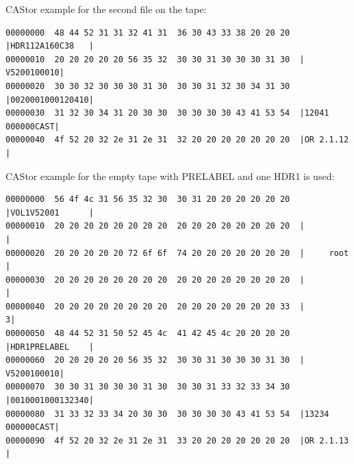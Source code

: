 \begin{table}[H]
\begin{center}
\begin{tabularx}{\textwidth}{ |c|c|c|X| }
\end{tabularx}
\end{center}
CAStor example for the second file on the tape:
\begin{small}
\begin{verbatim}
00000000  48 44 52 31 31 32 41 31  36 30 43 33 38 20 20 20  |HDR112A160C38   |
00000010  20 20 20 20 20 56 35 32  30 30 31 30 30 30 31 30  |     V5200100010|
00000020  30 30 32 30 30 30 31 30  30 30 31 32 30 34 31 30  |0020001000120410|
00000030  31 32 30 34 31 20 30 30  30 30 30 30 43 41 53 54  |12041 000000CAST|
00000040  4f 52 20 32 2e 31 2e 31  32 20 20 20 20 20 20 20  |OR 2.1.12       |
\end{verbatim}
\end{small}
\end{table}

\begin{minipage}{\linewidth}
CAStor example for the empty tape with PRELABEL and one HDR1 is used:
\begin{small}
\begin{verbatim}
00000000  56 4f 4c 31 56 35 32 30  30 31 20 20 20 20 20 20  |VOL1V52001      |
00000010  20 20 20 20 20 20 20 20  20 20 20 20 20 20 20 20  |                |
00000020  20 20 20 20 20 72 6f 6f  74 20 20 20 20 20 20 20  |     root       |
00000030  20 20 20 20 20 20 20 20  20 20 20 20 20 20 20 20  |                |
00000040  20 20 20 20 20 20 20 20  20 20 20 20 20 20 20 33  |               3|
00000050  48 44 52 31 50 52 45 4c  41 42 45 4c 20 20 20 20  |HDR1PRELABEL    |
00000060  20 20 20 20 20 56 35 32  30 30 31 30 30 30 31 30  |     V5200100010|
00000070  30 30 31 30 30 30 31 30  30 30 31 33 32 33 34 30  |0010001000132340|
00000080  31 33 32 33 34 20 30 30  30 30 30 30 43 41 53 54  |13234 000000CAST|
00000090  4f 52 20 32 2e 31 2e 31  33 20 20 20 20 20 20 20  |OR 2.1.13       |
\end{verbatim}
\end{small}
\end{minipage}

